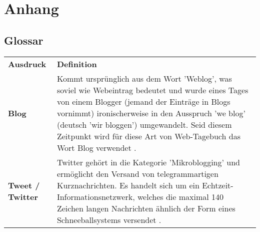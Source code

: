 %
%


\appendix
\chapter{Anhang}\label{chap.anhang}
\section{Glossar}\label{sec.glossar}
\begin{table}[ht] \centering
	\begin{tabular}{b{4cm} m{11cm} }	
		\rowcolor{gray} 
		
		\textbf{Ausdruck} & \textbf{Definition} \\ 
		\textbf{Blog} & Kommt ursprünglich aus dem Wort 'Weblog', was soviel wie Webeintrag bedeutet und wurde eines Tages von einem Blogger (jemand der Einträge in Blogs vornimmt) ironischerweise in den Ausspruch 'we blog' (deutsch 'wir bloggen') umgewandelt. Seid diesem Zeitpunkt wird für diese Art von Web-Tagebuch das Wort Blog verwendet \cite{Kaplan:2012}.  \\ 
		\textbf{Tweet / Twitter} & Twitter gehört in die Kategorie 'Mikroblogging' und ermöglicht den Versand von telegrammartigen Kurznachrichten. Es handelt sich um ein Echtzeit-Informationsnetzwerk, welches die maximal 140 Zeichen langen Nachrichten ähnlich der Form eines Schneeballsystems versendet \cite{Twitter:2012}. \\ 
	
	\end{tabular}
	\label{tab:glossar}
\end{table}


